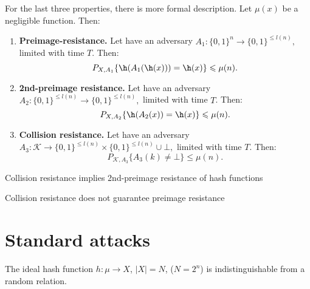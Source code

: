 For the last three properties, there is more formal description.
Let $\mu(x)$ be a negligible function. Then:
\begin{enumerate}[noitemsep]
    \item \textbf{Preimage-resistance.}
        Let have an adversary
        $A_1: \{0, 1\}^{n} \rightarrow \{0, 1\}^{\leqslant l(n)},$
        limited with time $T$. Then:
        $$P_{X, A_1}\{\h(A_1(\h(x))) = \h(x)\} \leqslant \mu(n).$$
    \item \textbf{2nd-preimage resistance.}
        Let have an adversary
        $A_2: \{0, 1\}^{\leqslant l(n)} \rightarrow \{0, 1\}^{\leqslant l(n)},$
        limited with time $T$. Then:
        $$P_{X, A_2}\{\h(A_2(x)) = \h(x)\} \leqslant \mu(n).$$
    \item \textbf{Collision resistance.}
        Let have an adversary
        $A_3: \mathcal{K} \rightarrow \{0, 1\}^{\leqslant l(n)} \times \{0, 1\}^{\leqslant l(n)} \cup \bot,$
        limited with time $T$. Then:
        $$P_{\mathcal{K}, A_3}\{A_3(k) \neq \bot\} \leqslant \mu(n).$$
\end{enumerate}

\begin{lemma}[Damgor]
    Collision resistance implies 2nd-preimage resistance of hash functions
\end{lemma}

\begin{remark}
    Collision resistance does not guarantee preimage resistance
\end{remark}

\section{Standard attacks}

The ideal hash function $h: \mu \rightarrow X$, $|X| = N$, ($N = 2^{n}$)
is indistinguishable from a random relation.

